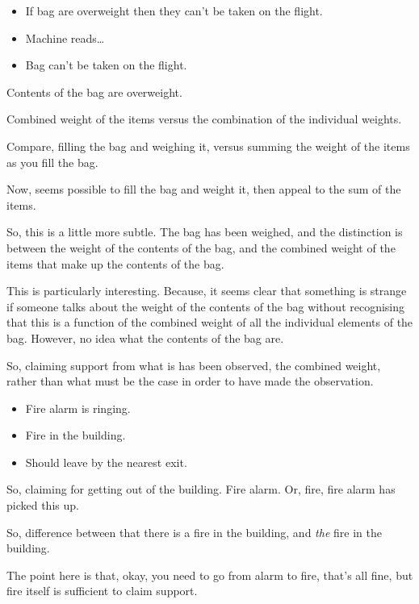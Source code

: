 \begin{note}

  \begin{illustration}
    \mbox{}
    \vspace{-\baselineskip}
    \begin{itemize}
    \item If bag are overweight then they can't be taken on the flight.
    \item Machine reads\dots
    \item Bag can't be taken on the flight.
    \end{itemize}
  \end{illustration}
  Contents of the bag are overweight.

  Combined weight of the items versus the combination of the individual weights.

  Compare, filling the bag and weighing it, versus summing the weight of the items as you fill the bag.

  Now, seems possible to fill the bag and weight it, then appeal to the sum of the items.

  So, this is a little more subtle.
  The bag has been weighed, and the distinction is between the weight of the contents of the bag, and the combined weight of the items that make up the contents of the bag.

  This is particularly interesting.
  Because, it seems clear that something is strange if someone talks about the weight of the contents of the bag without recognising that this is a function of the combined weight of all the individual elements of the bag.
  However, no idea what the contents of the bag are.

  So, claiming support from what is has been observed, the combined weight, rather than what must be the case in order to have made the observation.
\end{note}

\begin{note}
  \begin{illustration}
    \mbox{}
    \vspace{-\baselineskip}
    \begin{itemize}
    \item Fire alarm is ringing.
    \item Fire in the building.
    \item Should leave by the nearest exit.
    \end{itemize}
  \end{illustration}
  So, claiming for getting out of the building.
  Fire alarm.
  Or, fire, fire alarm has picked this up.

  So, difference between that there is a fire in the building, and \emph{the} fire in the building.

  The point here is that, okay, you need to go from alarm to fire, that's all fine, but fire itself is sufficient to claim support.
\end{note}

